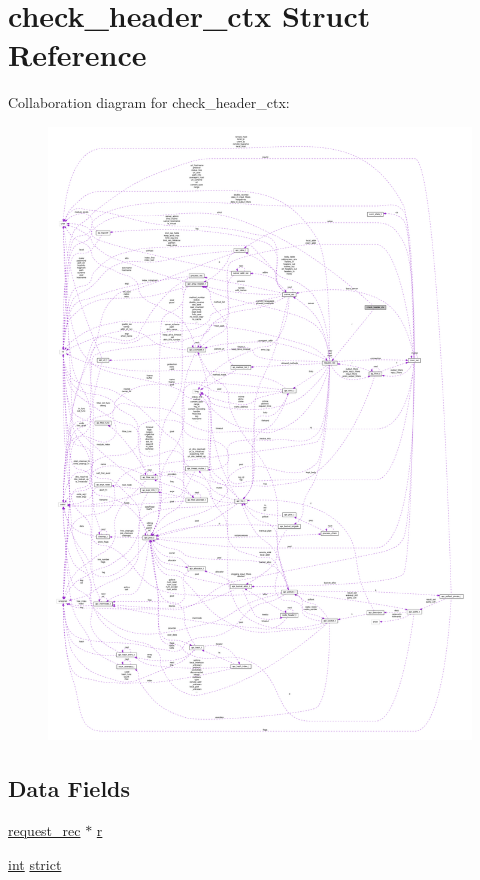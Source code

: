 \hypertarget{structcheck__header__ctx}{}\section{check\+\_\+header\+\_\+ctx Struct Reference}
\label{structcheck__header__ctx}


Collaboration diagram for check\+\_\+header\+\_\+ctx\+:
\nopagebreak
\begin{figure}[H]
\begin{center}
\leavevmode
\includegraphics[width=350pt]{structcheck__header__ctx__coll__graph}
\end{center}
\end{figure}
\subsection*{Data Fields}
\begin{DoxyCompactItemize}
\item 
\hyperlink{structrequest__rec}{request\+\_\+rec} $\ast$ \hyperlink{structcheck__header__ctx_a1c493689a4f69f9a4fe2fa2dcc95fc36}{r}
\item 
\hyperlink{pcre_8txt_a42dfa4ff673c82d8efe7144098fbc198}{int} \hyperlink{structcheck__header__ctx_a23a8c2ac4741fc2d14f25e7af0cfc5b5}{strict}
\end{DoxyCompactItemize}


